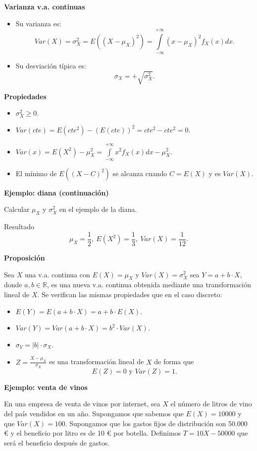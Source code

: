 \documentclass[]{book}
\providecommand{\tightlist}{%
  \setlength{\itemsep}{0pt}\setlength{\parskip}{0pt}}
\begin{document}
 \textbf{Varianza v.a. continuas}

\begin{itemize}
\tightlist
\item
  Su varianza es:
  \[
  Var(X)=\sigma_{X}^2=E((X-\mu_{X})^2)=
  \displaystyle\int\limits_{-\infty}^{+\infty} (x-\mu_{X})^2 f_{X}(x)dx.
  \]
\item
  Su desviación típica es: \[\sigma_{X}=+\sqrt{\sigma_{X}^2}.\]
\end{itemize}

 \textbf{Propiedades}

\begin{itemize}
\tightlist
\item
  \(\sigma_{X}^2\geq 0\).
\item
  \(Var(cte)=E(cte^2)-(E(cte))^2= cte^2 - cte^2=0\).
\item
  \(\displaystyle Var(x)=E(X^2)-\mu_{X}^2=\int\limits_{-\infty}^{+\infty}x^2 f_{X}(x)dx - \mu_{X}^2.\)
\item
  El mínimo de \(E((X-C)^2)\) se alcanza cuando \(C=E(X)\) y es \(Var(X)\).
\end{itemize}

\textbf{Ejemplo: diana (continuación)}

Calcular \(\mu_{X}\) y \(\sigma_{X}^2\) en el ejemplo de la diana.

Resultado
\[\mu_{X}=\frac12,\ E(X^2)=\frac13,\ Var(X)=\frac1{12}.\]

\textbf{Proposición}

Sea \(X\) una v.a. continua con \(E(X)=\mu_{X}\) y \(Var(X)=\sigma_{X}^2\) sea \(Y=a+b\cdot X\), donde
\(a,b\in\mathbb{R}\), es una nueva v.a. continua obtenida mediante una transformación lineal de \(X\).
Se verifican las mismas propiedades que en el caso discreto:

\begin{itemize}
\tightlist
\item
  \(E(Y)=E(a+b\cdot X)=a+b\cdot E(X)\).
\item
  \(Var(Y)=Var(a+b\cdot X)=b^2\cdot Var(X)\).
\item
  \(\sigma_{Y}=|b|\cdot \sigma_{X}\).
\item
  \(Z=\frac{X-\mu_{X}}{\sigma_{X}}\) es una transformación
  lineal de \(X\) de forma que
  \[E(Z)=0 \mbox{ y } Var(Z)=1.\]
\end{itemize}

\textbf{Ejemplo: venta de vinos}

En una empresa de venta de vinos por internet, sea
\(X\) el número de litros de vino del país vendidos en un año.
Supongamos que sabemos que \(E(X)=10000\) y que \(Var(X)=100\).
Supongamos que los gastos fijos de distribución son
50.000 € y el beneficio por litro es de 10 € por botella.
Definimos \(T=10 X-50000\) que será el beneficio después de gastos.
\end{document}
